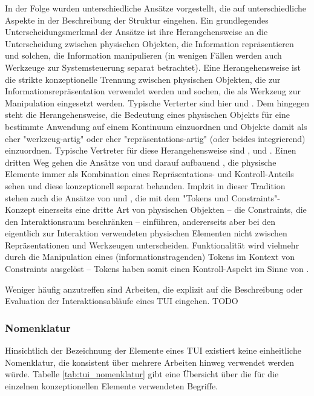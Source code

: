 In der Folge wurden unterschiedliche Ansätze vorgestellt, die auf unterschiedliche Aspekte in der Beschreibung der Struktur eingehen. Ein grundlegendes Unterscheidungsmerkmal der Ansätze ist ihre Herangehensweise an die Unterscheidung zwischen physischen Objekten, die Information repräsentieren und solchen, die Information manipulieren (in wenigen Fällen werden auch Werkzeuge zur Systemsteuerung separat betrachtet). Eine Herangehensweise ist die strikte konzeptionelle Trennung zwischen physischen Objekten, die zur Informationsrepräsentation verwendet werden und sochen, die als Werkzeug zur Manipulation eingesetzt werden. Typische Verterter sind hier \citep{Ishii97} und \citep{Holmquist99}. Dem hingegen steht die Herangehensweise, die Bedeutung eines physischen Objekts für eine bestimmte Anwendung auf einem Kontinuum einzuordnen und Objekte damit als eher "werkzeug-artig" oder eher "repräsentations-artig" (oder beides integrierend) einzuordnen. Typische Vertreter für diese Herangehensweise sind \citep{Underkoffler99}, \citep{Koleva03} und \citep{Fishkin04}. Einen dritten Weg gehen die Ansätze von \citep{Ullmer00} und darauf aufbauend \citep{Ishii08}, die physische Elemente immer als Kombination eines Repräsentations- und Kontroll-Anteils sehen und diese konzeptionell separat behanden. Implzit in dieser Tradition stehen auch die Ansätze von \citep{Ullmer02} und \citep{Shaer04}, die mit dem "Tokens und Constraints"-Konzept einerseits eine dritte Art von physischen Objekten -- die Constraints, die den Interaktionsraum beschränken -- einführen, andererseits aber bei den eigentlich zur Interaktion verwendeten physischen Elementen nicht zwischen Repräsentationen und Werkzeugen unterscheiden. Funktionalität wird vielmehr durch die Manipulation eines (informationstragenden) Tokens im Kontext von Constraints ausgelöst -- Tokens haben somit einen Kontroll-Aspekt im Sinne von \citep{Ullmer00}.

Weniger häufig anzutreffen sind Arbeiten, die explizit auf die Beschreibung oder Evaluation der Interaktionsabläufe eines \gls{TUI} eingehen. TODO


\subsubsection{Nomenklatur}

Hinsichtlich der Bezeichnung der Elemente eines \gls{TUI} existiert keine einheitliche Nomenklatur, die konsistent über mehrere Arbeiten hinweg verwendet werden würde. Tabelle \ref{tab:tui_nomenklatur} gibt eine Übersicht über die für die einzelnen konzeptionellen Elemente verwendeten Begriffe.

